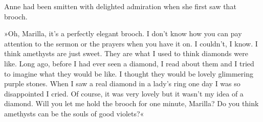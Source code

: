 Anne had been smitten with delighted admiration when she first saw that brooch.

»Oh, Marilla, it's a perfectly elegant brooch. I don't know how you can pay attention to the sermon or the prayers when you have it on. I couldn't, I know. I think amethysts are just sweet. They are what I used to think diamonds were like. Long ago, before I had ever seen a diamond, I read about them and I tried to imagine what they would be like. I thought they would be lovely glimmering purple stones. When I saw a real diamond in a lady's ring one day I was so disappointed I cried. Of course, it was very lovely but it wasn't my idea of a diamond. Will you let me hold the brooch for one minute, Marilla? Do you think amethysts can be the souls of good violets?«